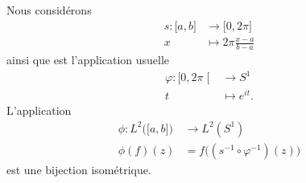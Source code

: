 \begin{proposition}
    Nous considérons
    \begin{equation}
        \begin{aligned}
            s\colon \mathopen[ a , b \mathclose]&\to \mathopen[ 0 , 2\pi \mathclose] \\
            x&\mapsto 2\pi\frac{ x-a }{ b-a }
        \end{aligned}
    \end{equation}
    ainsi que est l'application usuelle
    \begin{equation}
        \begin{aligned}
            \varphi\colon \mathopen[ 0 , 2\pi \mathclose[&\to S^1 \\
                t&\mapsto  e^{it}.
        \end{aligned}
    \end{equation}
    L'application
    \begin{equation}
        \begin{aligned}
            \phi\colon L^2\big( \mathopen[ a , b \mathclose] \big)&\to L^2(S^1) \\
            \phi(f)(z)&=f\big( (s^{-1}\circ \varphi^{-1})(z) \big)
        \end{aligned}
    \end{equation}
    est une bijection isométrique.
\end{proposition}

